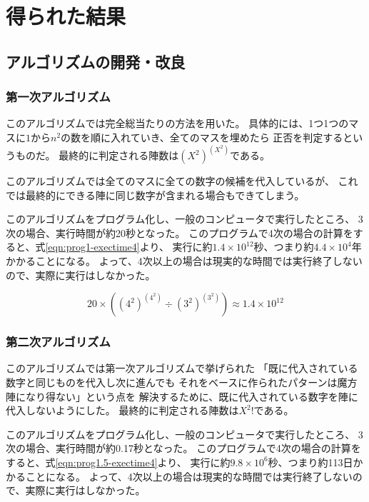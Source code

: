 \section{得られた結果}
\subsection{アルゴリズムの開発・改良}
\subsubsection{第一次アルゴリズム}
このアルゴリズムでは完全総当たりの方法を用いた。
具体的には、1つ1つのマスに$1$から$n^2$の数を順に入れていき、全てのマスを埋めたら
正否を判定するというものだ。
最終的に判定される陣数は$(X^2)^{(X^2)}$である。

このアルゴリズムでは全てのマスに全ての数字の候補を代入しているが、
これでは最終的にできる陣に同じ数字が含まれる場合もできてしまう。


このアルゴリズムをプログラム化し、一般のコンピュータで実行したところ、
3次の場合、実行時間が約20秒となった。
このプログラムで4次の場合の計算をすると、式\ref{eqn:prog1-exectime4}より、
実行に約$1.4 \times 10^{12}$秒、つまり約$4.4 \times 10^4$年かかることになる。
よって、4次以上の場合は現実的な時間では実行終了しないので、実際に実行はしなかった。

\begin{equation} \label{eqn:prog1-exectime4}
20 \times ((4^2)^{(4^2)} \div (3^2)^{(3^2)}) \approx 1.4 \times 10^{12}
\end{equation}


\subsubsection{第二次アルゴリズム}
このアルゴリズムでは第一次アルゴリズムで挙げられた
「既に代入されている数字と同じものを代入し次に進んでも
それをベースに作られたパターンは魔方陣になり得ない」という点を
解決するために、既に代入されている数字を陣に代入しないようにした。
最終的に判定される陣数は$X^2!$である。

このアルゴリズムをプログラム化し、一般のコンピュータで実行したところ、
3次の場合、実行時間が約0.17秒となった。
このプログラムで4次の場合の計算をすると、式\ref{eqn:prog1.5-exectime4}より、
実行に約$9.8 \times 10^6$秒、つまり約113日かかることになる。
よって、4次以上の場合は現実的な時間では実行終了しないので、実際に実行はしなかった。


